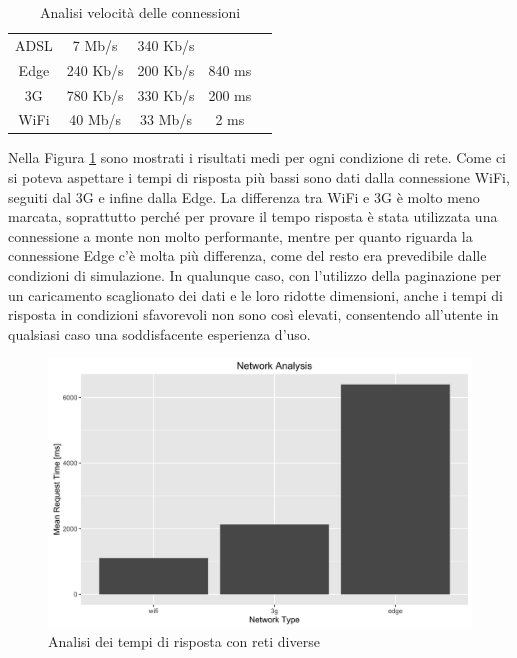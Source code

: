 \begin{table}[ht]
	\caption{Analisi velocità delle connessioni}
	\label{table:connections-data-test}
	\begin{tabularx}{\textwidth}{CCCCC}
		\toprule
		 &  &  &   \\
		\midrule
			ADSL & 7 Mb/s & 340 Kb/s &\\ 
			\hline
			Edge & 240 Kb/s & 200 Kb/s & 840 ms \\ 
			3G  & 780 Kb/s & 330 Kb/s & 200 ms \\
			WiFi  & 40 Mb/s & 33 Mb/s & 2 ms \\
		\bottomrule
	\end{tabularx}
\end{table}

Nella Figura \ref{fig:network-time-analysis} sono mostrati i risultati medi per ogni condizione di rete. Come ci si poteva aspettare i tempi di risposta più bassi sono dati dalla connessione WiFi, seguiti dal 3G e infine dalla Edge. La differenza tra WiFi e 3G è molto meno marcata, soprattutto perché per provare il tempo risposta è stata utilizzata una connessione a monte non molto performante, mentre per quanto riguarda la connessione Edge c'è molta più differenza, come del resto era prevedibile dalle condizioni di simulazione. In qualunque caso, con l'utilizzo della paginazione per un caricamento scaglionato dei dati e le loro ridotte dimensioni, anche i tempi di risposta in condizioni sfavorevoli non sono così elevati, consentendo all'utente in qualsiasi caso una soddisfacente esperienza d'uso.

\begin{figure}[ht]
	\centering
	\includegraphics[width=\textwidth]{7-performance/Immagini/network_time_analysis.png}
	\caption{Analisi dei tempi di risposta con reti diverse}\label{fig:network-time-analysis}
\end{figure}